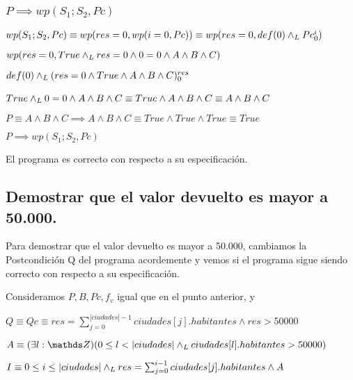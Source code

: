 \documentclass[10pt,a4paper]{article}
\begin{document}
\subsubsection{$P \implies wp(S_{1};S_{2}, Pc)$}
$wp(S_{1};S_{2}, Pc) \equiv wp(res = 0, wp(i = 0, Pc)) \equiv wp(res = 0, def(0) \land _L Pc_{0}^{i})$ \equiv \par
\vspace{5px}
$wp(res = 0, True \land _L res = 0 \wedge 0 = 0 \wedge A \wedge B \wedge C) $ \equiv \par
\vspace{5px}
$def(0) \land _L (res = 0 \wedge True \wedge A \wedge B \wedge C)_{0}^{res} $ \equiv \par
\vspace{5px}
$True \land _L 0 = 0 \wedge A \wedge B \wedge C \equiv True \wedge A \wedge B \wedge C \equiv  A \wedge B \wedge C $ \ \par
\vspace{20px}
$P \equiv A \wedge B \wedge C \implies A \wedge B \wedge C \equiv True \wedge True \wedge True \equiv True$ \par
\vspace{5px}
\begin{center}
    $P \implies wp(S_{1};S_{2}, Pc)$
\end{center}
El programa es correcto con respecto a su especificación.

\subsection{Demostrar que el valor devuelto es mayor a 50.000.}
Para demostrar que el valor devuelto es mayor a 50.000, cambiamos la Postcondición Q del programa acordemente y vemos si el programa sigue siendo correcto con respecto a su especificación.

Consideramos $P, B, Pc, f_{v}$ igual que en el punto anterior, y \\ \par
$Q \equiv Qc \equiv res = \sum_{j=0}^{|ciudades|-1} ciudades[j].habitantes \wedge res > 50000$ \\ \par
$A \equiv (\exists l: \ent)(0 \leq l < |ciudades| \yLuego ciudades[l].habitantes > 50000)$\\ \par
$I \equiv 0 \leq i \leq |ciudades| \land _L res = \sum_{j=0}^{i-1} ciudades[j].habitantes \wedge A$
\end{document}

